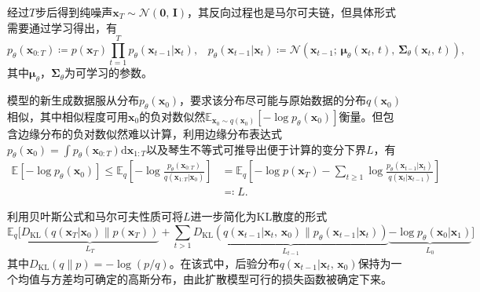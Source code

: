 经过$T$步后得到纯噪声$\boldsymbol{x}_T \sim \mathcal{N}(\mathbf{0}\text{, } \mathbf{I})$，其反向过程也是马尔可夫链，但具体形式需要通过学习得出，有
\begin{equation*}
p_{\theta}(\boldsymbol{x}_{0:T}) \coloneqq p(\boldsymbol{x}_T) \prod\limits_{t=1}^T p_{\theta}(\boldsymbol{x}_{t-1} \vert \boldsymbol{x}_t)\text{,} \quad p_{\theta}(\boldsymbol{x}_{t-1} \vert \boldsymbol{x}_t) \coloneqq \mathcal{N} (\boldsymbol{x}_{t-1}\text{; } \boldsymbol{\mu}_{\theta} (\boldsymbol{x}_t\text{, } t) \text{, } \boldsymbol{\Sigma}_{\theta} (\boldsymbol{x}_t\text{, } t) )\text{,}
\tag{3.2}
\end{equation*}
\noindent 其中$\boldsymbol{\mu}_{\theta}$，$\boldsymbol{\Sigma}_{\theta}$为可学习的参数。

模型的新生成数据服从分布$p_{\theta}(\boldsymbol{x}_0)$，要求该分布尽可能与原始数据的分布$q(\boldsymbol{x}_0)$相似，其中相似程度可用$\boldsymbol{x}_0$的负对数似然$\mathbb{E}_{\boldsymbol{x}_0 \sim q(\boldsymbol{x}_0)}\left[ -\log p_{\theta}(\boldsymbol{x}_0) \right] $衡量。但包含边缘分布的负对数似然难以计算，利用边缘分布表达式$p_{\theta}(\boldsymbol{x}_0) =\int p_{\theta}(\boldsymbol{x}_{0:T}) \text{d}\boldsymbol{x}_{1:T}$以及琴生不等式可推导出便于计算的变分下界$L$，有
\begin{equation*}
\begin{aligned}
\mathbb{E} \left[ -\log p_{\theta}(\boldsymbol{x}_0) \right] \leq \mathbb{E}_q \left[ -\log \frac{p_{\theta}(\boldsymbol{x}_{0:T})}{q(\boldsymbol{x}_{1:T} \vert \boldsymbol{x}_0)} \right] &= \mathbb{E}_q \left[ -\log p(\boldsymbol{x}_T)-\sum_{t \geq 1} \log \frac{p_{\theta}(\boldsymbol{x}_{t-1} \vert \boldsymbol{x}_t)}{q(\boldsymbol{x}_t \vert \boldsymbol{x}_{t-1})} \right] \\
&\eqqcolon L\text{.}
\end{aligned}
\tag{3.3}
\end{equation*}

利用贝叶斯公式和马尔可夫性质可将$L$进一步简化为$\text{KL}$散度的形式
\begin{equation*}
\mathbb{E}_q \biggl[ \underbrace{D_{\text{KL}}(q(\boldsymbol{x}_T \vert \boldsymbol{x}_0) \parallel p(\boldsymbol{x}_T))}_{L_T} + \sum_{t>1} \underbrace{D_{\text{KL}}(q(\boldsymbol{x}_{t-1} \vert \boldsymbol{x}_t\text{, } \boldsymbol{x}_0) \parallel p_{\theta}(\boldsymbol{x}_{t-1} \vert \boldsymbol{x}_t))}_{L_{t-1}} \underbrace{ - \log p_{\theta}(\boldsymbol{x}_0 \vert \boldsymbol{x}_1) }_{L_0} \biggr]
\tag{3.4}
\end{equation*}
\noindent 其中$D_{\text{KL}}(q \parallel p)=-\log (p/q) $。在该式中，后验分布$q(\boldsymbol{x}_{t-1} \vert \boldsymbol{x}_t\text{, } \boldsymbol{x}_0)$保持为一个均值与方差均可确定的高斯分布，由此扩散模型可行的损失函数被确定下来。

